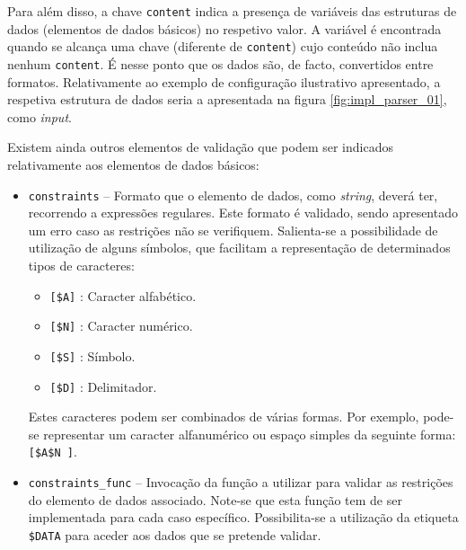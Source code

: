 Para além disso, a chave \texttt{content} indica a presença de variáveis das estruturas de dados (elementos de dados básicos) no respetivo valor. A variável é encontrada quando se alcança uma chave (diferente de \texttt{content}) cujo conteúdo não inclua nenhum \texttt{content}. É nesse ponto que os dados são, de facto, convertidos entre formatos. Relativamente ao exemplo de configuração ilustrativo apresentado, a respetiva estrutura de dados seria a apresentada na figura \ref{fig:impl_parser_01}, como \textit{input}.

Existem ainda outros elementos de validação que podem ser indicados relativamente aos elementos de dados básicos:

\begin{itemize}
    \item \texttt{constraints} -- Formato que o elemento de dados, como \textit{string}, deverá ter, recorrendo a expressões regulares. Este formato é validado, sendo apresentado um erro caso as restrições não se verifiquem. Salienta-se a possibilidade de utilização de alguns símbolos, que facilitam a representação de determinados tipos de caracteres:
    \begin{itemize}
        \item \texttt{[\$A]} : Caracter alfabético.
        \item \texttt{[\$N]} : Caracter numérico.
        \item \texttt{[\$S]} : Símbolo.
        \item \texttt{[\$D]} : Delimitador.
    \end{itemize}
    Estes caracteres podem ser combinados de várias formas. Por exemplo, pode-se representar um caracter alfanumérico ou espaço simples da seguinte forma: \texttt{[\$A\$N ]}.

    \item \texttt{constraints\_func} -- Invocação da função a utilizar para validar as restrições do elemento de dados associado. Note-se que esta função tem de ser implementada para cada caso específico. Possibilita-se a utilização da etiqueta \texttt{\$DATA} para aceder aos dados que se pretende validar.
    

\end{itemize}
